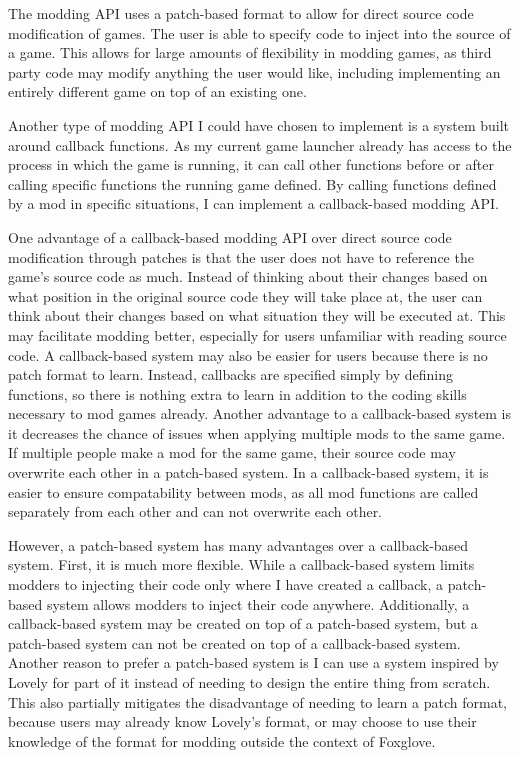 \documentclass[10pt,twocolumn]{article}
\begin{document}
The modding API uses a patch-based format 
to allow for direct
source code modification of games.
The user is
able to specify code to inject into the source of a game. This allows for large
amounts of flexibility in modding games, as third party code may modify anything
the user would like, including implementing an entirely different game on top of
an existing one.

Another type of modding API I could have chosen to implement is a system built
around
callback functions. As my current game launcher already has access to the
process in which the game is running, it can call other functions before or
after calling specific functions the running game defined. By calling functions
defined by a mod in specific situations, I can implement a callback-based
modding API.

One advantage of a callback-based modding API over direct source code
modification through patches is that the user does not have to reference the
game's source code as much. Instead of thinking about their changes based on
what position in the original source code they will take place at, the user can
think about their changes based on what situation they will be executed at. This
may facilitate modding better, especially for users unfamiliar with reading
source code. A callback-based system may also be easier for users because there
is no patch format to learn. Instead, callbacks are specified simply by defining
functions, so there is nothing extra to learn in addition to the coding skills
necessary to mod games already. Another advantage to a callback-based system is
it decreases the chance of issues when applying multiple mods to the same game.
If multiple people make a mod for the same game, their source code may overwrite
each other in a patch-based system. In a callback-based system, it is easier to
ensure compatability between mods, as all mod functions are called separately
from each other and can not overwrite each other.

However, a patch-based system has many advantages over a callback-based system.
First, it is much more flexible. While a callback-based system limits modders to
injecting their code only where I have created a callback, a patch-based system
allows modders to inject their code anywhere. Additionally, a callback-based
system may be created on top of a patch-based system, but a patch-based system
can not be created on top of a callback-based system. Another reason to prefer a
patch-based system is I can use a system inspired by Lovely for part of it
instead of needing to
design the entire thing from scratch. This also partially mitigates the
disadvantage of needing to learn a patch format, because users may already know
Lovely's format,
or may choose to use their knowledge of the format for modding
outside the context of Foxglove.
\end{document}
